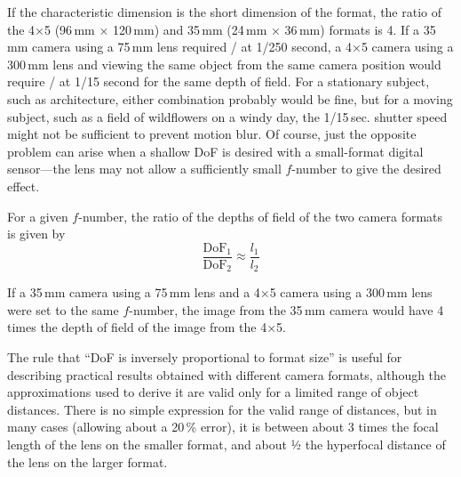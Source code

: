 \documentclass[11pt, oneside]{scrartcl}   	%
\newcommand{\f}[1]{\mbox{\raisebox{2pt}{\footnotesize $f$\hspace{-1.2pt}}/\hspace{-0.6pt}\raisebox{-0.6pt}{\small #1}}}
\begin{document}
If the characteristic dimension is the short dimension of the format, the ratio of the 4×5 (96\,mm × 120\,mm) and 35\,mm (24\,mm × 36\,mm) formats is 4. If a 35\,mm camera using a 75\,mm lens required \f8 at 1/250 second, a 4×5 camera using a 300\,mm lens and viewing the same object from the same camera position would require \f{32} at 1/15 second for the same depth of field. For a stationary subject, such as architecture, either combination probably would be fine, but for a moving subject, such as a field of wildflowers on a windy day, the 1/15\,sec. shutter speed might not be sufficient to prevent motion blur. Of course, just the opposite problem can arise when a shallow DoF is desired with a small-format digital sensor—the lens may not allow a sufficiently small $f$-number to give the desired effect.

For a given $f$-number, the ratio of the depths of field of the two camera formats is given by
\begin{equation}
   \frac{\mathrm{DoF}_1}{\mathrm{DoF}_2} \approx \frac{l_1}{l_2}
   \label{eq:77}
\end{equation}

If a 35\,mm camera using a 75\,mm lens and a 4×5 camera using a 300\,mm lens were set to the same $f$-number, the image from the 35\,mm camera would have 4 times the depth of field of the image from the 4×5.

The rule that “DoF is inversely proportional to format size” is useful for describing practical results obtained with different camera formats, although the approximations used to derive it are valid only for a limited range of object distances. There is no simple expression for the valid range of distances, but in many cases (allowing about a 20\,\% error), it is between about 3 times the focal length of the lens on the smaller format, and about 1⁄2 the hyperfocal distance of the lens on the larger format.
\end{document}
